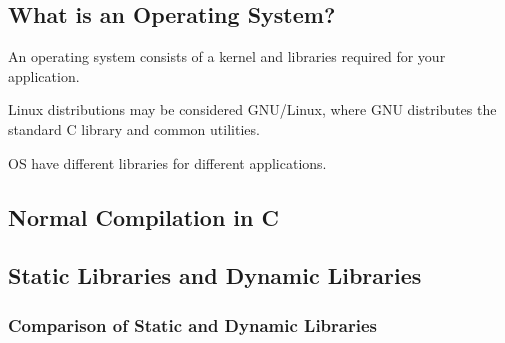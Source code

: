 \subsection{What is an Operating System?}
\begin{definition}
    An operating system consists of a kernel and libraries required for your application.
\end{definition}

\begin{notes}
    Linux distributions may be considered GNU/Linux, where GNU distributes the standard C library and common utilities.
\end{notes}

\begin{warning}
    OS have different libraries for different applications.
\end{warning}

\subsection{Normal Compilation in C}

\subsection{Static Libraries and Dynamic Libraries}

\subsubsection{Comparison of Static and Dynamic Libraries}

